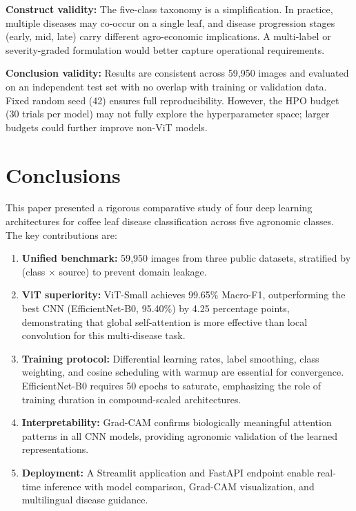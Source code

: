 \documentclass[conference]{IEEEtran}
\begin{document}
\textbf{Construct validity:} The five-class taxonomy is a simplification.
In practice, multiple diseases may co-occur on a single leaf, and disease
progression stages (early, mid, late) carry different agro-economic
implications. A multi-label or severity-graded formulation would better
capture operational requirements.

\textbf{Conclusion validity:} Results are consistent across 59{,}950 images
and evaluated on an independent test set with no overlap with training or
validation data. Fixed random seed (42) ensures full reproducibility.
However, the HPO budget (30 trials per model) may not fully explore the
hyperparameter space; larger budgets could further improve non-ViT models.

\section{Conclusions}

This paper presented a rigorous comparative study of four deep learning
architectures for coffee leaf disease classification across five agronomic
classes. The key contributions are:

\begin{enumerate}
  \item \textbf{Unified benchmark:} 59{,}950 images from three public
    datasets, stratified by (class $\times$ source) to prevent domain leakage.
  \item \textbf{ViT superiority:} ViT-Small achieves 99.65\% Macro-F1,
    outperforming the best CNN (EfficientNet-B0, 95.40\%) by 4.25 percentage
    points, demonstrating that global self-attention is more effective than
    local convolution for this multi-disease task.
  \item \textbf{Training protocol:} Differential learning rates, label
    smoothing, class weighting, and cosine scheduling with warmup are
    essential for convergence. EfficientNet-B0 requires 50 epochs to
    saturate, emphasizing the role of training duration in compound-scaled
    architectures.
  \item \textbf{Interpretability:} Grad-CAM confirms biologically meaningful
    attention patterns in all CNN models, providing agronomic validation of
    the learned representations.
  \item \textbf{Deployment:} A Streamlit application and FastAPI endpoint
    enable real-time inference with model comparison, Grad-CAM visualization,
    and multilingual disease guidance.
\end{enumerate}
\end{document}
